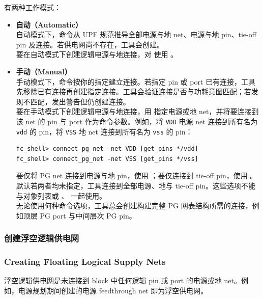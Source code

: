  有两种工作模式：
\begin{itemize}
  \item \textbf{自动（Automatic）}\\
    自动模式下，命令从 UPF 规范推导全部电源与地 net、电源与地 pin、tie-off pin 及连接。若供电网尚不存在，工具会创建。\\
    要在自动模式下创建逻辑电源与地连接，对  使用 。

  \item \textbf{手动（Manual）}\\
    手动模式下，命令按你的指定建立连接。若指定 pin 或 port 已有连接，工具先移除已有连接再创建指定连接。工具会验证连接是否与功耗意图匹配；若发现不匹配，发出警告但仍创建连接。\\
    要在手动模式下创建逻辑电源与地连接，用  指定电源或地 net，并将要连接到该 net 的 pin 与 port 作为命令参数。例如，将 \texttt{VDD} 电源 net 连接到所有名为 \texttt{vdd} 的 pin，将 \texttt{VSS} 地 net 连接到所有名为 \texttt{vss} 的 pin：
\begin{lstlisting}
fc_shell> connect_pg_net -net VDD [get_pins */vdd]
fc_shell> connect_pg_net -net VSS [get_pins */vss]
\end{lstlisting}
    要仅将 PG net 连接到电源与地 pin，使用 ；要仅连接到 tie-off pin，使用 。默认若两者均未指定，工具连接到全部电源、地与 tie-off pin。这些选项不能与对象列表或 、 一起使用。\\
    无论使用何种命令选项，工具总会创建构建完整 PG 网表结构所需的连接，例如顶层 PG port 与中间层次 PG pin。
\end{itemize}

\subsubsection{创建浮空逻辑供电网}
\subsubsection*{Creating Floating Logical Supply Nets}

浮空逻辑供电网是未连接到 block 中任何逻辑 pin 或 port 的电源或地 net。例如，电源规划期间创建的电源 feedthrough net 即为浮空供电网。

